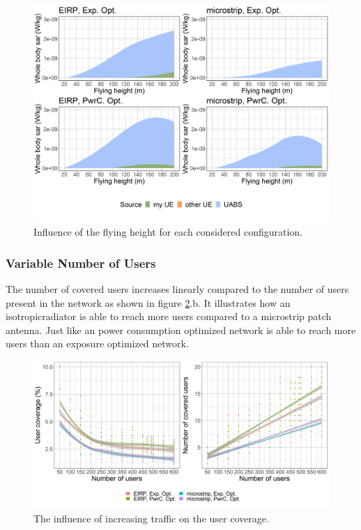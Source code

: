 \documentclass[twocolumn]{phdsymp} %
\begin{document}
\begin{figure}[h!]
\centering
  \includegraphics[width=\linewidth]{s2/fhFourSources.png}
  \caption{Influence of the flying height for each considered configuration.
  }
  \label{fig:s2shfourSourcesMatrix}
\end{figure}

\FloatBarrier
\subsubsection{Variable Number of Users}
The number of covered users increases linearly compared to the number of users present in the network as shown in figure 
\ref{fig:s2uvsnumcovusers}.b. It illustrates how an \gls{isotropicradiator} is able to reach more users 
compared to a microstrip patch antenna. Just like an power consumption optimized network 
is able to reach more users than an exposure optimized network.
\begin{figure}[h!]
  \includegraphics[width=\linewidth]{s2/uvsnumdronesAndCov.png}
  \caption{The influence of increasing traffic on the user coverage.}
  \label{fig:s2uvsnumcovusers}
\end{figure}
\end{document}
